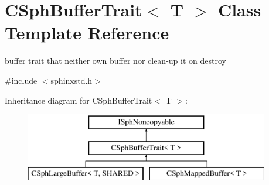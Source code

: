 \hypertarget{classCSphBufferTrait}{\section{C\-Sph\-Buffer\-Trait$<$ T $>$ Class Template Reference}
\label{classCSphBufferTrait}
}


buffer trait that neither own buffer nor clean-\/up it on destroy  




{\ttfamily \#include $<$sphinxstd.\-h$>$}

Inheritance diagram for C\-Sph\-Buffer\-Trait$<$ T $>$\-:\begin{figure}[H]
\begin{center}
\leavevmode
\includegraphics[height=3.000000cm]{classCSphBufferTrait}
\end{center}
\end{figure}
